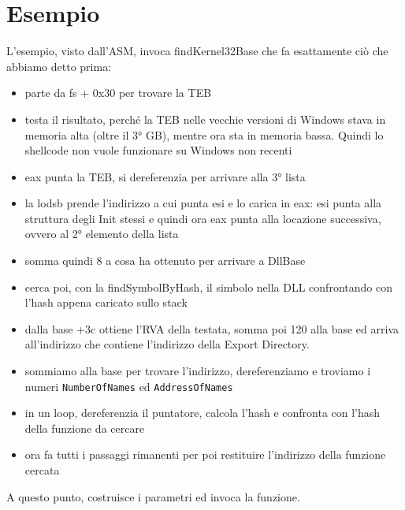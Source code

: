 \documentclass[12pt, oneside]{extbook}
\begin{document}
\section{Esempio}
L'esempio, visto dall'ASM, invoca findKernel32Base che fa esattamente ciò che abbiamo detto prima:
\begin{itemize}
	\item parte da fs + 0x30 per trovare la TEB
	\item testa il risultato, perché la TEB nelle vecchie versioni di Windows stava in memoria alta (oltre il 3° GB), mentre ora sta in memoria bassa. Quindi lo shellcode non vuole funzionare su Windows non recenti
	\item eax punta la TEB, si dereferenzia per arrivare alla 3° lista
	\item la lodsb prende l'indirizzo  a cui punta esi e lo carica in eax: esi punta alla struttura degli Init stessi e quindi ora eax punta alla locazione successiva, ovvero al 2° elemento della lista
	\item somma quindi 8 a cosa ha ottenuto per arrivare a DllBase
	\item cerca poi, con la findSymbolByHash, il simbolo nella DLL confrontando con l'hash appena caricato sullo stack
	\item dalla base +3c ottiene l'RVA della testata, somma poi 120 alla base ed arriva all'indirizzo che contiene l'indirizzo della Export Directory.
	\item sommiamo alla base per trovare l'indirizzo, dereferenziamo e troviamo i numeri \texttt{NumberOfNames} ed \texttt{AddressOfNames}
	\item in un loop, dereferenzia il puntatore, calcola l'hash e confronta con l'hash della funzione da cercare
	\item ora fa tutti i passaggi rimanenti per poi restituire l'indirizzo della funzione cercata
\end{itemize}
A questo punto, costruisce i parametri ed invoca la funzione.
\end{document}
